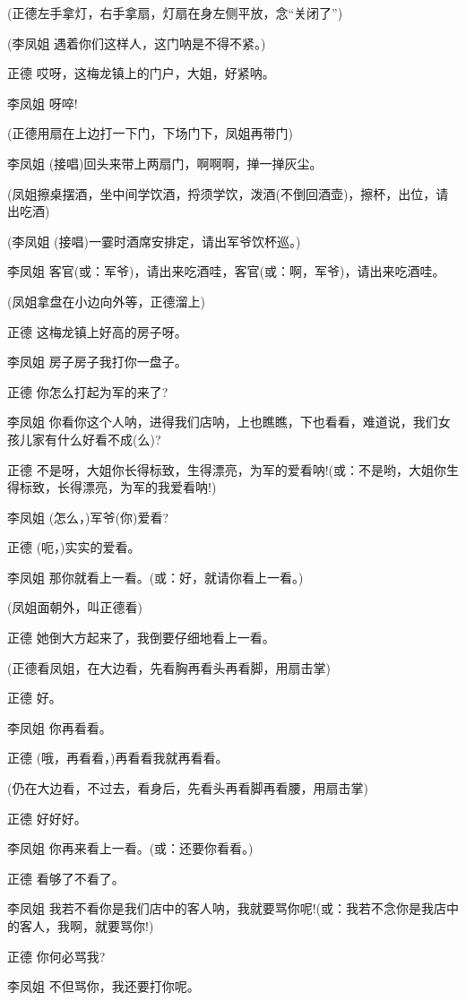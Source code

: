(正德左手拿灯，右手拿扇，灯扇在身左侧平放，念``关闭了'')

(李凤姐 遇着你们这样人，这门呐是不得不紧。)

正德 哎呀，这梅龙镇上的门户，大姐，好紧呐。

李凤姐 呀啐!

(正德用扇在上边打一下门，下场门下，凤姐再带门)

李凤姐 (接唱)回头来带上两扇门，啊啊啊，掸一掸灰尘。

(凤姐擦桌摆酒，坐中间学饮酒，捋须学饮，泼酒(不倒回酒壶)，擦杯，出位，请出吃酒)

(李凤姐 (接唱)一霎时酒席安排定，请出军爷饮杯巡。)

李凤姐 客官(或：军爷)，请出来吃酒哇，客官(或：啊，军爷)，请出来吃酒哇。

(凤姐拿盘在小边向外等，正德溜上)

正德 这梅龙镇上好高的房子呀。

李凤姐 房子房子我打你一盘子。

正德 你怎么打起为军的来了?

李凤姐
你看你这个人呐，进得我们店呐，上也瞧瞧，下也看看，难道说，我们女孩儿家有什么好看不成(么)?

正德
不是呀，大姐你长得标致，生得漂亮，为军的爱看呐!(或：不是哟，大姐你生得标致，长得漂亮，为军的我爱看呐!)

李凤姐 (怎么，)军爷(你)爱看?

正德 (呃，)实实的爱看。

李凤姐 那你就看上一看。(或：好，就请你看上一看。)

(凤姐面朝外，叫正德看)

正德 她倒大方起来了，我倒要仔细地看上一看。

(正德看凤姐，在大边看，先看胸再看头再看脚，用扇击掌)

正德 好。

李凤姐 你再看看。

正德 (哦，再看看，)再看看我就再看看。

(仍在大边看，不过去，看身后，先看头再看脚再看腰，用扇击掌)

正德 好好好。

李凤姐 你再来看上一看。(或：还要你看看。)

正德 看够了不看了。

李凤姐
我若不看你是我们店中的客人呐，我就要骂你呢!(或：我若不念你是我店中的客人，我啊，就要骂你!)

正德 你何必骂我?

李凤姐 不但骂你，我还要打你呢。

